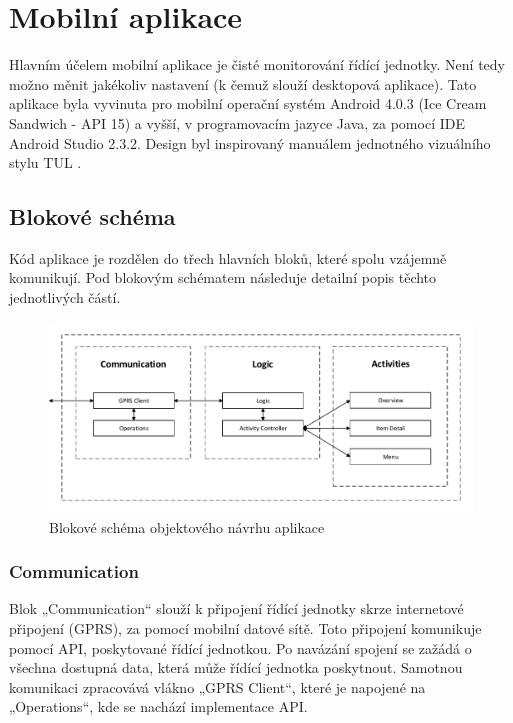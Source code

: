 \documentclass[FM,DP]{tulthesis}  %
\begin{document}

\chapter{Mobilní aplikace}
Hlavním účelem mobilní aplikace je čisté monitorování řídící jednotky. Není tedy možno měnit jakékoliv nastavení (k čemuž slouží desktopová aplikace). Tato aplikace byla vyvinuta pro mobilní operační systém Android 4.0.3 (Ice Cream Sandwich - API 15) a vyšší, v programovacím jazyce Java, za pomocí IDE Android Studio 2.3.2. Design byl inspirovaný manuálem jednotného vizuálního stylu TUL \cite{TULVisual}.

\section{Blokové schéma}
Kód aplikace je rozdělen do třech hlavních bloků, které spolu vzájemně komunikují. Pod blokovým schématem následuje detailní popis těchto jednotlivých částí.

\begin{figure}[H]
\begin{center}
\includegraphics[width=\textwidth]{vector/blokoveSchemaSecurityViewer.pdf}
\caption{Blokové schéma objektového návrhu aplikace}
\label{image}
\end{center}
\end{figure}

\subsection{Communication}
Blok „Communication“ slouží k připojení řídící jednotky skrze internetové připojení (GPRS), za pomocí mobilní datové sítě. Toto připojení komunikuje pomocí API, poskytované řídící jednotkou. Po navázání spojení se zažádá o všechna dostupná data, která může řídící jednotka poskytnout. Samotnou komunikaci zpracovává vlákno „GPRS Client“, které je napojené na „Operations“, kde se nachází implementace API.
\end{document}
